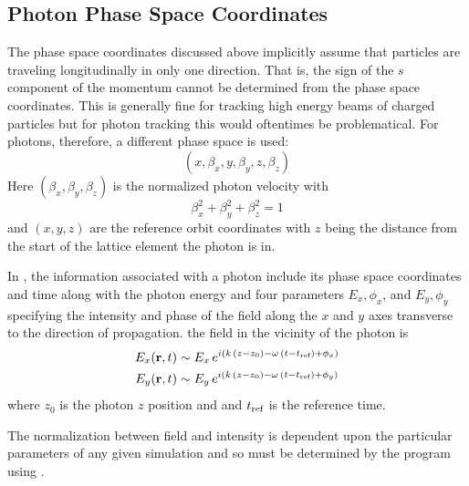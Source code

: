 \subsection{Photon Phase Space Coordinates}
\label{s:photon.phase.space}

The phase space coordinates discussed above implicitly assume that
particles are traveling longitudinally in only one direction. That is,
the sign of the $s$ component of the momentum cannot be determined
from the phase space coordinates. This is generally fine for tracking
high energy beams of charged particles but for photon tracking this
would oftentimes be problematical. For photons, therefore, a different
phase space is used:
\begin{equation}
  (x, \beta_x, y, \beta_y, z, \beta_z)
  \label{xbybzb}
\end{equation}
Here $(\beta_x, \beta_y, \beta_z)$ is the normalized photon velocity with
\begin{equation}
  \beta_x^2 + \beta_y^2 + \beta_z^2 = 1 
  \label{bbb1}
\end{equation}
and $(x, y, z)$ are the reference orbit coordinates with $z$ being the
distance from the start of the lattice element the photon is in.

In \accellat, the information associated with a photon include its phase
space coordinates and time along with the photon energy and four
parameters $E_x, \phi_x$, and $E_y, \phi_y$ specifying the intensity
and phase of the field along the $x$ and $y$ axes transverse to the
direction of propagation.  the field in the vicinity of the photon is
\begin{align}
  E_x ({\bf r}, t) &\sim E_x \, e^{i (k \, (z - z_0) - \omega \, (t - t_{\text{ref}}) + \phi_x)} \nonumber \\
  E_y ({\bf r}, t) &\sim E_y \, e^{i (k \, (z - z_0) - \omega \, (t - t_{\text{ref}}) + \phi_y)} 
  \label{ertee}
\end{align}
where $z_0$ is the photon $z$ position and and $t_{\text{ref}}$ is the reference time.

The normalization between field and intensity is dependent upon the
particular parameters of any given simulation and so must be
determined by the program using \accellat.

